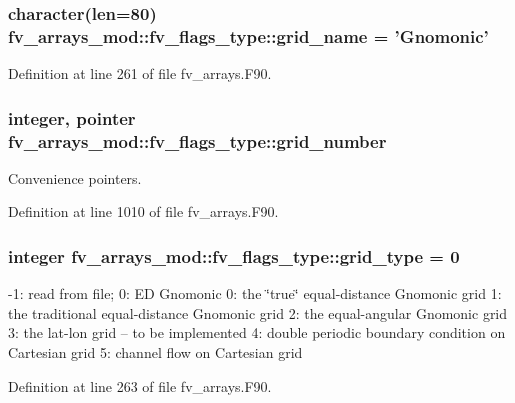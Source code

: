 \subsubsection[{grid\-\_\-name}]{\setlength{\rightskip}{0pt plus 5cm}character(len=80) fv\-\_\-arrays\-\_\-mod\-::fv\-\_\-flags\-\_\-type\-::grid\-\_\-name = 'Gnomonic'}\label{structfv__arrays__mod_1_1fv__flags__type_a3db69164bedf77520133bab7a563ad64}


Definition at line 261 of file fv\-\_\-arrays.\-F90.

\subsubsection[{grid\-\_\-number}]{\setlength{\rightskip}{0pt plus 5cm}integer, pointer fv\-\_\-arrays\-\_\-mod\-::fv\-\_\-flags\-\_\-type\-::grid\-\_\-number}\label{structfv__arrays__mod_1_1fv__flags__type_aa5c3b16f742d10f6de7d4cffb401e7d1}


Convenience pointers. 



Definition at line 1010 of file fv\-\_\-arrays.\-F90.

\subsubsection[{grid\-\_\-type}]{\setlength{\rightskip}{0pt plus 5cm}integer fv\-\_\-arrays\-\_\-mod\-::fv\-\_\-flags\-\_\-type\-::grid\-\_\-type = 0}\label{structfv__arrays__mod_1_1fv__flags__type_aee15326da7e817a68d9591e7dca01325}


-\/1\-: read from file; 0\-: E\-D Gnomonic 0\-: the \char`\"{}true\char`\"{} equal-\/distance Gnomonic grid 1\-: the traditional equal-\/distance Gnomonic grid 2\-: the equal-\/angular Gnomonic grid 3\-: the lat-\/lon grid -- to be implemented 4\-: double periodic boundary condition on Cartesian grid 5\-: channel flow on Cartesian grid 



Definition at line 263 of file fv\-\_\-arrays.\-F90.

